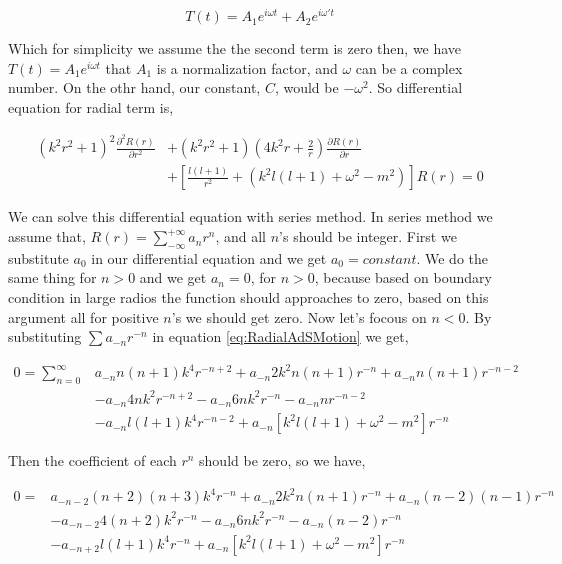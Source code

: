 \begin{equation}
    T(t) = A_1e^{i \omega t} + A_2e^{i \omega' t}
\end{equation}

Which for simplicity we assume the the second term is zero then, we have $T(t) = A_1e^{i \omega t}$ that $A_1$ is a normalization factor, and $\omega$ can be a complex number. On the othr hand, our constant, $C$, would be $-\omega^2$. So differential equation for radial term is,

\begin{align} \label{eq:RadialAdSMotion}
    (k^2r^2+1)^2 \frac{\partial^2 R(r)}{\partial r^2} &+ (k^2r^2 + 1)(4k^2r+\frac{2}{r})\frac{\partial R(r)}{\partial r}\\
    & + \left[ \frac{l(l+1)}{r^2} + (k^2l(l+1) + \omega^2 - m^2) \right]R(r) = 0 \nonumber
\end{align}

We can solve this differential equation with series method. In series method we assume that, $R(r) = \sum\limits_{-\infty}^{+\infty} a_n r^n$, and all $n$'s should be integer. First we substitute $a_0$ in our differential equation and we get $a_0 = constant$. We do the same thing for $n > 0$ and we get $a_n = 0$, for $n>0$, because based on boundary condition in large radios the function should approaches to zero, based on this argument all for positive $n$'s we should get zero. Now let's focous on $n<0$. By substituting $\sum a_{-n} r^{-n}$ in equation \ref{eq:RadialAdSMotion} we get,

\begin{align}
    0 = \sum\limits_{n=0}^{\infty} & a_{-n}n(n+1)k^4r^{-n+2} + a_{-n}2k^2 n(n+1)r^{-n} + a_{-n} n(n+1)r^{-n-2} \nonumber\\
                                   & - a_{-n}4nk^2r^{-n+2} - a_{-n}6nk^2r^{-n} - a_{-n}nr^{-n-2} \\
                                   & - a_{-n}l(l+1)k^4r^{-n-2} + a_{-n}\left[k^2l(l+1)+\omega^2-m^2\right]r^{-n} \nonumber
\end{align}

Then the coefficient of each $r^{n}$ should be zero, so we have,

\begin{align}
    0 = & a_{-n-2}(n+2)(n+3)k^4r^{-n} + a_{-n}2k^2 n(n+1)r^{-n} + a_{-n} (n-2)(n-1)r^{-n} \nonumber\\
        & - a_{-n-2}4(n+2)k^2r^{-n} - a_{-n}6nk^2r^{-n} - a_{-n}(n-2)r^{-n} \\
        & - a_{-n+2}l(l+1)k^4r^{-n} + a_{-n}\left[ k^2 l(l+1) + \omega^2 - m^2 \right] r^{-n} \nonumber
\end{align}

